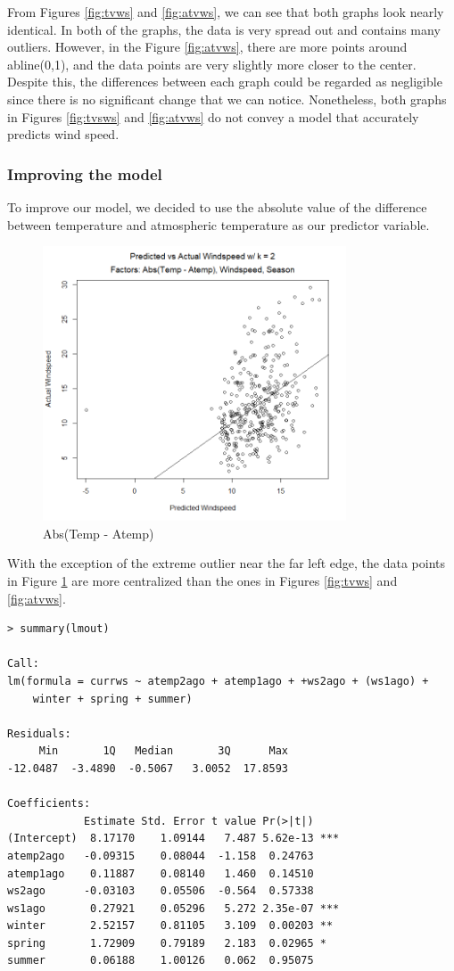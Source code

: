 \documentclass[12pt]{article}
\begin{document}
From Figures \ref{fig:tvws} and \ref{fig:atvws}, we can see that both graphs look nearly identical. In both of the graphs, the data is very spread out and contains many outliers. However, in the Figure \ref{fig:atvws}, there are more points around abline(0,1), and the data points are very slightly more closer to the center. Despite this, the differences between each graph could be regarded as negligible since there is no significant change that we can notice. Nonetheless, both graphs in Figures \ref{fig:tvsws} and \ref{fig:atvws} do not convey a model that accurately predicts wind speed.

\subsubsection{Improving the model}

To improve our model, we decided to use the absolute value of the difference between temperature and atmospheric temperature as our predictor variable.   
 
\begin{figure} [!h]
	\centering
  	\includegraphics[width=90mm]{T-Awk2.png}
 	\caption{Abs(Temp - Atemp)}
 	\label{fig:tawk2}
\end{figure} 

With the exception of the extreme outlier near the far left edge, the data points in Figure \ref{fig:tawk2} are more centralized than the ones in Figures \ref{fig:tvws} and \ref{fig:atvws}. 

\begin{verbatim}
> summary(lmout)

Call:
lm(formula = currws ~ atemp2ago + atemp1ago + +ws2ago + (ws1ago) + 
    winter + spring + summer)

Residuals:
     Min       1Q   Median       3Q      Max 
-12.0487  -3.4890  -0.5067   3.0052  17.8593 

Coefficients:
            Estimate Std. Error t value Pr(>|t|)    
(Intercept)  8.17170    1.09144   7.487 5.62e-13 ***
atemp2ago   -0.09315    0.08044  -1.158  0.24763    
atemp1ago    0.11887    0.08140   1.460  0.14510    
ws2ago      -0.03103    0.05506  -0.564  0.57338    
ws1ago       0.27921    0.05296   5.272 2.35e-07 ***
winter       2.52157    0.81105   3.109  0.00203 ** 
spring       1.72909    0.79189   2.183  0.02965 *  
summer       0.06188    1.00126   0.062  0.95075    
\end{verbatim}
\end{document}
